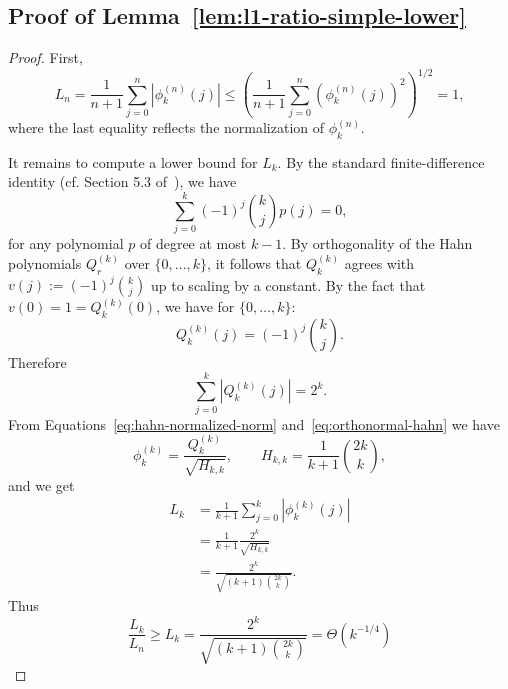 \documentclass[manuscript,nonacm]{acmart}
\begin{document}
\subsection{Proof of Lemma~\ref{lem:l1-ratio-simple-lower}}
\begin{proof}
First,
\[
    L_n
    =
    \frac1{n+1}\sum_{j=0}^n |\phi_k^{(n)}(j)|
    \le
    \left(
        \frac1{n+1}\sum_{j=0}^n (\phi_k^{(n)}(j))^2
    \right)^{1/2}
    =
    1,
\]
where the last equality reflects the normalization of \(\phi_k^{(n)}\).

It remains to compute a lower bound for \(L_k\). By the standard finite-difference identity (cf. Section 5.3 of~\cite{GrahamKnuthPatashnik1989}), we have
\[
    \sum_{j=0}^k (-1)^j\binom{k}{j}p(j)=0,
\]
for any polynomial $p$ of degree at most $k-1$. By orthogonality of the Hahn polynomials $Q_r^{(k)}$ over $\{0,...,k\}$, it follows that $Q_k^{(k)}$ agrees with $v(j):=(-1)^j\binom{k}{j}$ up to scaling by a constant. By the fact that $v(0)=1=Q_k^{(k)}(0)$, we have for \(\{0,\dots,k\}\):
\[
    Q_k^{(k)}(j)=(-1)^j\binom{k}{j}.
\]
Therefore
\[
    \sum_{j=0}^k |Q_k^{(k)}(j)|=2^k.
\]
From Equations~\ref{eq:hahn-normalized-norm} and~\ref{eq:orthonormal-hahn} we have
\[
    \phi_k^{(k)}
    =
    \frac{Q_k^{(k)}}{\sqrt{H_{k,k}}},
    \qquad
    H_{k,k}
    =
    \frac{1}{k+1}\binom{2k}{k},
\]
and we get
\[
\begin{aligned}
    L_k
    &=
    \frac1{k+1}\sum_{j=0}^k |\phi_k^{(k)}(j)|  \\
    &=
    \frac1{k+1}\frac{2^k}{\sqrt{H_{k,k}}}      \\
    &=
    \frac{2^k}{\sqrt{(k+1)\binom{2k}{k}}}.
\end{aligned}
\]
Thus
\[
    \frac{L_k}{L_n}\ge L_k
    =
    \frac{2^k}{\sqrt{(k+1)\binom{2k}{k}}}=\Theta(k^{-1/4})
\]
\end{proof}
\end{document}
